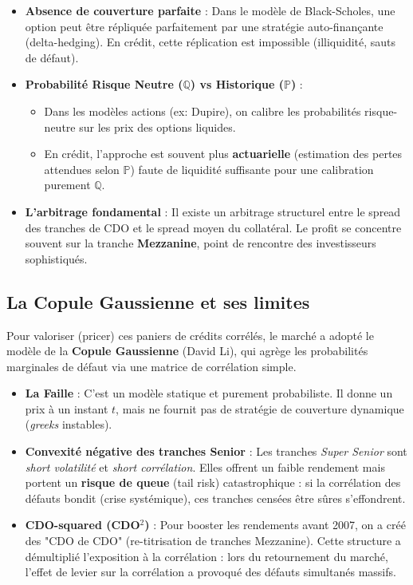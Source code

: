 \begin{itemize}
    \item \textbf{Absence de couverture parfaite} : Dans le modèle de Black-Scholes, une option peut être répliquée parfaitement par une stratégie auto-finançante (delta-hedging). En crédit, cette réplication est impossible (illiquidité, sauts de défaut).
    \item \textbf{Probabilité Risque Neutre ($\mathbb{Q}$) vs Historique ($\mathbb{P}$)} : 
    \begin{itemize}
        \item Dans les modèles actions (ex: Dupire), on calibre les probabilités risque-neutre sur les prix des options liquides.
        \item En crédit, l'approche est souvent plus \textbf{actuarielle} (estimation des pertes attendues selon $\mathbb{P}$) faute de liquidité suffisante pour une calibration purement $\mathbb{Q}$.
    \end{itemize}
    \item \textbf{L'arbitrage fondamental} : Il existe un arbitrage structurel entre le spread des tranches de CDO et le spread moyen du collatéral. Le profit se concentre souvent sur la tranche \textbf{Mezzanine}, point de rencontre des investisseurs sophistiqués.
\end{itemize}

\subsection{La Copule Gaussienne et ses limites}
Pour valoriser (pricer) ces paniers de crédits corrélés, le marché a adopté le modèle de la \textbf{Copule Gaussienne} (David Li), qui agrège les probabilités marginales de défaut via une matrice de corrélation simple.

\begin{itemize}
    \item \textbf{La Faille} : C'est un modèle statique et purement probabiliste. Il donne un prix à un instant $t$, mais ne fournit pas de stratégie de couverture dynamique (\textit{greeks} instables).
    \item \textbf{Convexité négative des tranches Senior} : Les tranches \textit{Super Senior} sont \textit{short volatilité} et \textit{short corrélation}. Elles offrent un faible rendement mais portent un \textbf{risque de queue} (tail risk) catastrophique : si la corrélation des défauts bondit (crise systémique), ces tranches censées être sûres s'effondrent.
    \item \textbf{CDO-squared (CDO$^2$)} : Pour booster les rendements avant 2007, on a créé des "CDO de CDO" (re-titrisation de tranches Mezzanine). Cette structure a démultiplié l'exposition à la corrélation : lors du retournement du marché, l'effet de levier sur la corrélation a provoqué des défauts simultanés massifs.
\end{itemize}

